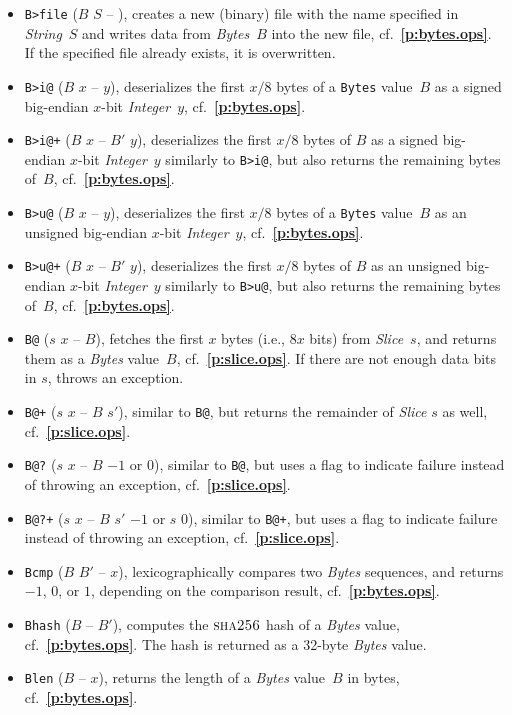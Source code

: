 \documentclass[12pt,oneside]{article}
\def\refpoint#1{{\rm\textbf{\ref{#1}}}}
\let\ptref=\refpoint
\def\opsc#1{\operatorname{\textsc{#1}}}
\def\Sha{\opsc{sha256}}
\begin{document}
\begin{itemize}
\item {\tt B>file} ($B$ $S$ -- ), creates a new (binary) file with the name specified in {\em String\/}~$S$ and writes data from {\em Bytes}~$B$ into the new file, cf.~\ptref{p:bytes.ops}. If the specified file already exists, it is overwritten.
\item {\tt B>i@} ($B$ $x$ -- $y$), deserializes the first $x/8$ bytes of a {\tt Bytes} value~$B$ as a signed big-endian $x$-bit {\em Integer}~$y$, cf.~\ptref{p:bytes.ops}.
\item {\tt B>i@+} ($B$ $x$ -- $B'$ $y$), deserializes the first $x/8$ bytes of $B$ as a signed big-endian $x$-bit {\em Integer}~$y$ similarly to {\tt B>i@}, but also returns the remaining bytes of~$B$, cf.~\ptref{p:bytes.ops}.
\item {\tt B>u@} ($B$ $x$ -- $y$), deserializes the first $x/8$ bytes of a {\tt Bytes} value~$B$ as an unsigned big-endian $x$-bit {\em Integer}~$y$, cf.~\ptref{p:bytes.ops}.
\item {\tt B>u@+} ($B$ $x$ -- $B'$ $y$), deserializes the first $x/8$ bytes of $B$ as an unsigned big-endian $x$-bit {\em Integer}~$y$ similarly to {\tt B>u@}, but also returns the remaining bytes of~$B$, cf.~\ptref{p:bytes.ops}.
\item {\tt B@} ($s$ $x$ -- $B$), fetches the first $x$ bytes (i.e., $8x$ bits) from {\em Slice}~$s$, and returns them as a {\em Bytes\/} value~$B$, cf.~\ptref{p:slice.ops}. If there are not enough data bits in $s$, throws an exception.
\item {\tt B@+} ($s$ $x$ -- $B$ $s'$), similar to {\tt B@}, but returns the remainder of {\em Slice\/} $s$ as well, cf.~\ptref{p:slice.ops}.
\item {\tt B@?} ($s$ $x$ -- $B$ $-1$ or $0$), similar to {\tt B@}, but uses a flag to indicate failure instead of throwing an exception, cf.~\ptref{p:slice.ops}.
\item {\tt B@?+} ($s$ $x$ -- $B$ $s'$ $-1$ or $s$ $0$), similar to {\tt B@+}, but uses a flag to indicate failure instead of throwing an exception, cf.~\ptref{p:slice.ops}.
\item {\tt Bcmp} ($B$ $B'$ -- $x$), lexicographically compares two {\em Bytes\/} sequences, and returns $-1$, $0$, or $1$, depending on the comparison result, cf.~\ptref{p:bytes.ops}.
\item {\tt Bhash} ($B$ -- $B'$), computes the $\Sha$ hash of a {\em Bytes\/} value, cf.~\ptref{p:bytes.ops}. The hash is returned as a 32-byte {\em Bytes\/} value.
\item {\tt Blen} ($B$ -- $x$), returns the length of a {\em Bytes\/} value~$B$ in bytes, cf.~\ptref{p:bytes.ops}.

\end{itemize}
\end{document}
